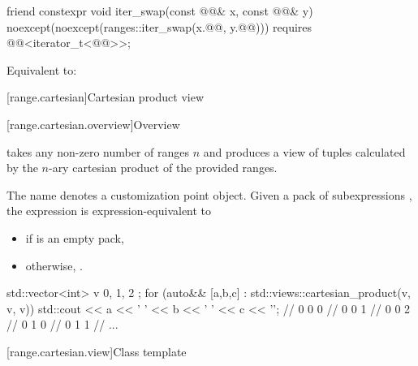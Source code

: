 %
\begin{itemdecl}
friend constexpr void iter_swap(const @@& x, const @@& y)
  noexcept(noexcept(ranges::iter_swap(x.@@, y.@@)))
  requires @@<iterator_t<@@>>;
\end{itemdecl}

\begin{itemdescr}
\pnum
\effects
Equivalent to:
\end{itemdescr}

[range.cartesian]{Cartesian product view}

[range.cartesian.overview]{Overview}

%
\pnum
{} takes any non-zero number of ranges $n$ and
produces a view of tuples calculated by
the $n$-ary cartesian product of the provided ranges.

\pnum
The name  denotes a customization point object.
Given a pack of subexpressions ,
the expression 
is expression-equivalent to
\begin{itemize}
\item
{}
if  is an empty pack,
\item
otherwise,
.
\end{itemize}

\pnum
\begin{example}
\begin{codeblock}
std::vector<int> v { 0, 1, 2 };
for (auto&& [a,b,c] : std::views::cartesian_product(v, v, v)) {
  std::cout << a << ' ' << b << ' ' << c << '\n';
  // 0 0 0
  // 0 0 1
  // 0 0 2
  // 0 1 0
  // 0 1 1
  // ...
}
\end{codeblock}
\end{example}

[range.cartesian.view]{Class template }

